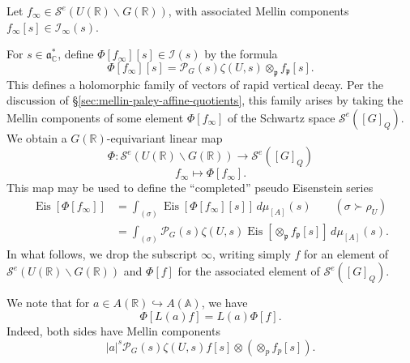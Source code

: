 \documentclass[reqno]{amsart}
\DeclareMathOperator{\Eis}{Eis}
\theoremstyle{plain} \newtheorem{theorem} {Theorem}
\theoremstyle{definition} \newtheorem{definition} [theorem] {Definition}
\theoremstyle{itplain} %
\numberwithin{equation}{section}
\numberwithin{theorem}{section}
\begin{document}
Let $f_\infty \in \mathcal{S}^e(U(\mathbb{R}) \backslash G(\mathbb{R}))$, with associated Mellin components $f_\infty[s] \in \mathcal{I}_\infty(s)$.

For $s \in \mathfrak{a}_{\mathbb{C}}^*$, define $\Phi[f_\infty][s] \in \mathcal{I}(s)$ by the formula 
\begin{equation}\label{eq:phis-:=-qn}
  \Phi[f_\infty][s] = \mathcal{P}_G(s) \zeta(U,s) \otimes_{\mathfrak{p}} f_\mathfrak{p}[s].
\end{equation}
This defines a holomorphic family of vectors of rapid vertical decay.  Per the discussion of \S\ref{sec:mellin-paley-affine-quotients}, this family arises by taking the Mellin components of some element $\Phi[f_\infty]$ of the Schwartz space $\mathcal{S}^e([G]_Q)$.  We obtain a $G(\mathbb{R})$-equivariant linear map
\begin{equation*}
  \Phi : \mathcal{S}^e(U(\mathbb{R}) \backslash G(\mathbb{R})) \rightarrow \mathcal{S}^e([G]_Q)
\end{equation*}
\begin{equation*}
  f_\infty \mapsto \Phi[f_\infty].
\end{equation*}
This map may be used to define the ``completed'' pseudo Eisenstein series
\begin{align*}
  \Eis[\Phi[f_\infty]]
  &= \int _{(\sigma)} \Eis[\Phi[f_\infty][s]] \, d \mu_{[A]}(s)
    \quad \quad (\sigma \succ \rho_U) \\
  &= \int _{(\sigma)} \mathcal{P}_G(s) \zeta(U,s)
    \Eis[\otimes_{\mathfrak{p}} f_\mathfrak{p}[s]] \, d \mu_{[A]}(s).
\end{align*}
In what follows, we drop the subscript $\infty$, writing simply $f$ for an element of $\mathcal{S}^e(U(\mathbb{R}) \backslash G(\mathbb{R}))$ and $\Phi[f]$ for the associated element of $\mathcal{S}^e([G]_Q)$.

We note that for $a \in A(\mathbb{R}) \hookrightarrow A(\mathbb{A})$, we have
\begin{equation*}
  \Phi[L(a) f] = L(a) \Phi[f].
\end{equation*}
Indeed, both sides have Mellin components
\begin{equation*}
  |a|^s \mathcal{P}_G(s) \zeta(U,s) f[s] \otimes (\otimes_p f_p[s]).
\end{equation*}
\end{document}
